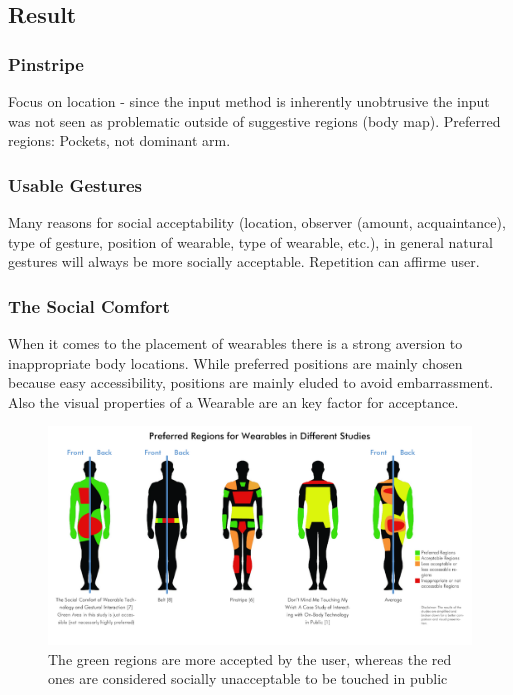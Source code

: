 \documentclass{sigchi}
\begin{document}
\subsection{Result}
\subsubsection{ Pinstripe} Focus on location - since the input method is inherently unobtrusive the input was not seen as problematic outside of suggestive regions (body map). Preferred regions: Pockets, not dominant arm.

\subsubsection{Usable Gestures}
Many reasons for social acceptability (location, observer (amount, acquaintance), type of gesture, position of wearable, type of wearable, etc.), in general natural gestures will always be more socially acceptable. Repetition can affirme user.

\subsubsection{The Social Comfort} When it comes to the placement of wearables there is a strong aversion to inappropriate body locations. While preferred positions are mainly chosen because easy accessibility, positions are mainly eluded to avoid embarrassment. Also the visual properties of a Wearable are an key factor for acceptance.
 \begin{figure}[t]
   \includegraphics[width=\textwidth]{body-areas.png}
   \caption{The green regions are more accepted by the user, whereas the red ones are considered socially unacceptable to be touched in public}
   \label{fig:body}
 \end{figure}

% 


\end{document}
